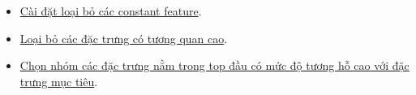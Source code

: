 \documentclass{report}
\begin{document}
\begin{itemize}
    \item \href{https://www.youtube.com/watch?v=uMlU2JaiOd8}{Cài đặt loại bỏ các constant feature}.
    \item \href{https://www.youtube.com/watch?v=FndwYNcVe0U&t=4s}{Loại bỏ các đặc trưng có tương quan cao}.
    \item \href{https://www.youtube.com/watch?v=i-MF3CXWWEM&list=PLZoTAELRMXVPgjwJ8VyRoqmfNs2CJwhVH&index=4}{Chọn nhóm các đặc trưng nằm trong top đầu có mức độ tương hỗ cao với đặc trưng mục tiêu}.
    
\end{itemize}
\end{document}
